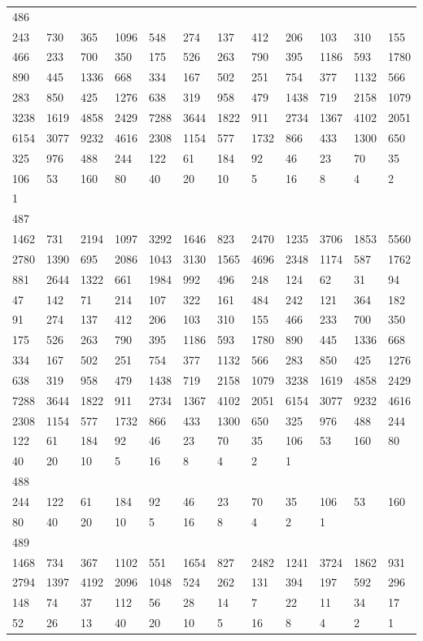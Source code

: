 \begin{longtable}{llllllllllll}
486&&&&&&&&&&&\\
243& 730& 365& 1096& 548& 274& 137& 412& 206& 103& 310& 155\\
466& 233& 700& 350& 175& 526& 263& 790& 395& 1186& 593& 1780\\
890& 445& 1336& 668& 334& 167& 502& 251& 754& 377& 1132& 566\\
283& 850& 425& 1276& 638& 319& 958& 479& 1438& 719& 2158& 1079\\
3238& 1619& 4858& 2429& 7288& 3644& 1822& 911& 2734& 1367& 4102& 2051\\
6154& 3077& 9232& 4616& 2308& 1154& 577& 1732& 866& 433& 1300& 650\\
325& 976& 488& 244& 122& 61& 184& 92& 46& 23& 70& 35\\
106& 53& 160& 80& 40& 20& 10& 5& 16& 8& 4& 2\\
1& \\

487&&&&&&&&&&&\\
1462& 731& 2194& 1097& 3292& 1646& 823& 2470& 1235& 3706& 1853& 5560\\
2780& 1390& 695& 2086& 1043& 3130& 1565& 4696& 2348& 1174& 587& 1762\\
881& 2644& 1322& 661& 1984& 992& 496& 248& 124& 62& 31& 94\\
47& 142& 71& 214& 107& 322& 161& 484& 242& 121& 364& 182\\
91& 274& 137& 412& 206& 103& 310& 155& 466& 233& 700& 350\\
175& 526& 263& 790& 395& 1186& 593& 1780& 890& 445& 1336& 668\\
334& 167& 502& 251& 754& 377& 1132& 566& 283& 850& 425& 1276\\
638& 319& 958& 479& 1438& 719& 2158& 1079& 3238& 1619& 4858& 2429\\
7288& 3644& 1822& 911& 2734& 1367& 4102& 2051& 6154& 3077& 9232& 4616\\
2308& 1154& 577& 1732& 866& 433& 1300& 650& 325& 976& 488& 244\\
122& 61& 184& 92& 46& 23& 70& 35& 106& 53& 160& 80\\
40& 20& 10& 5& 16& 8& 4& 2& 1& \\

488&&&&&&&&&&&\\
244& 122& 61& 184& 92& 46& 23& 70& 35& 106& 53& 160\\
80& 40& 20& 10& 5& 16& 8& 4& 2& 1& \\

489&&&&&&&&&&&\\
1468& 734& 367& 1102& 551& 1654& 827& 2482& 1241& 3724& 1862& 931\\
2794& 1397& 4192& 2096& 1048& 524& 262& 131& 394& 197& 592& 296\\
148& 74& 37& 112& 56& 28& 14& 7& 22& 11& 34& 17\\
52& 26& 13& 40& 20& 10& 5& 16& 8& 4& 2& 1\\


\end{longtable}
